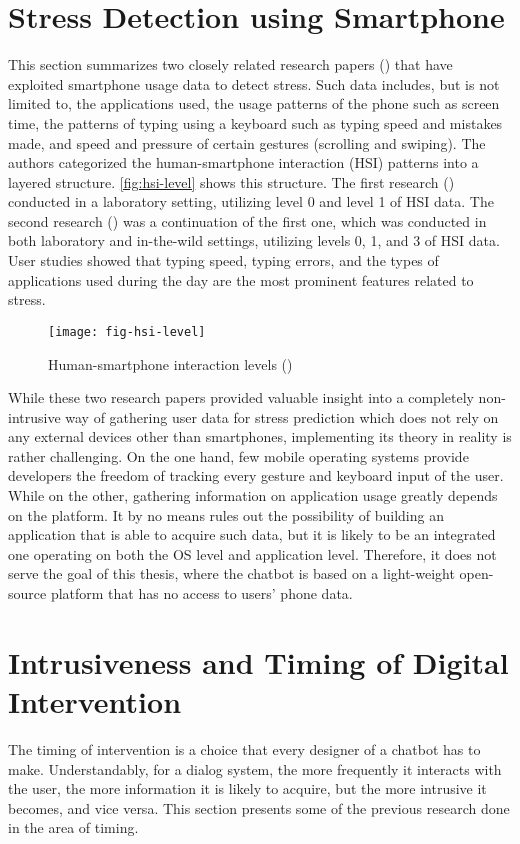 \section{Stress Detection using Smartphone}
This section summarizes two closely related research papers (\cite{20_ciman, 21_ciman_2}) that have exploited smartphone usage data to detect stress. Such data includes, but is not limited to, the applications used, the usage patterns of the phone such as screen time, the patterns of typing using a keyboard such as typing speed and mistakes made, and speed and pressure of certain gestures (scrolling and swiping). The authors categorized the human-smartphone interaction (HSI) patterns into a layered structure. \autoref{fig:hsi-level} shows this structure. The first research (\cite{20_ciman}) conducted in a laboratory setting, utilizing level 0 and level 1 of HSI data. The second research (\cite{21_ciman_2}) was a continuation of the first one, which was conducted in both laboratory and in-the-wild settings, utilizing levels 0, 1, and 3 of HSI data. User studies showed that typing speed, typing errors, and the types of applications used during the day are the most prominent features related to stress.

\begin{figure}[ht]
  \caption{Human-smartphone interaction levels (\cite{21_ciman_2})}
  \label{fig:hsi-level}
  \centering
  \texttt{[image: fig-hsi-level]}
\end{figure}

While these two research papers provided valuable insight into a completely non-intrusive way of gathering user data for stress prediction which does not rely on any external devices other than smartphones, implementing its theory in reality is rather challenging. On the one hand, few mobile operating systems provide developers the freedom of tracking every gesture and keyboard input of the user. While on the other, gathering information on application usage greatly depends on the platform. It by no means rules out the possibility of building an application that is able to acquire such data, but it is likely to be an integrated one operating on both the OS level and application level. Therefore, it does not serve the goal of this thesis, where the chatbot is based on a light-weight open-source platform that has no access to users' phone data.

\section{Intrusiveness and Timing of Digital Intervention}\label{section:timing}
The timing of intervention is a choice that every designer of a chatbot has to make. Understandably, for a dialog system, the more frequently it interacts with the user, the more information it is likely to acquire, but the more intrusive it becomes, and vice versa. This section presents some of the previous research done in the area of timing.\bigskip

